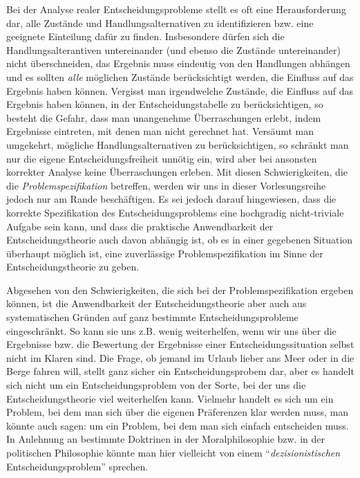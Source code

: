 Bei der Analyse realer Entscheidungsprobleme stellt es oft eine
Herausforderung  dar,
alle Zustände und Handlungsalternativen zu identifizieren bzw. eine
geeignete Einteilung dafür zu finden.  Insbesondere dürfen sich die
Handlungsalterantiven untereinander (und ebenso die Zustände
untereinander) nicht überschneiden, das Ergebnis muss eindeutig von
den Handlungen abhängen und es sollten {\em alle} möglichen Zustände
berücksichtigt werden, die Einfluss auf das Ergebnis haben
können. Vergisst man irgendwelche Zustände, die Einfluss auf das
Ergebnis haben können, in der Entscheidungstabelle zu berücksichtigen,
so besteht die Gefahr, dass man unangenehme Überraschungen erlebt,
indem Ergebnisse eintreten, mit denen man nicht gerechnet
hat. Versäumt man umgekehrt, mögliche Handlungsalternativen zu
berücksichtigen, so schränkt man nur die eigene Entscheidungsfreiheit
unnötig ein, wird aber bei ansonsten korrekter Analyse keine
Überraschungen erleben. Mit diesen Schwierigkeiten, die die {\em
  Problemspezifikation} betreffen, werden wir uns in dieser
Vorlesungsreihe jedoch nur am Rande beschäftigen. Es sei jedoch darauf
hingewiesen, dass die korrekte Spezifikation des Entscheidungsproblems
eine hochgradig nicht-triviale Aufgabe sein kann, und dass die
praktische Anwendbarkeit der Entscheidungstheorie auch davon abhängig
ist, ob es in einer gegebenen Situation überhaupt möglich ist, eine
zuverlässige Problemspezifikation im Sinne der Entscheidungstheorie zu
geben.

Abgesehen von den Schwierigkeiten, die sich bei der
Problemspezifikation ergeben  können, ist die Anwendbarkeit der
Entscheidungstheorie aber auch aus systematischen Gründen auf ganz
bestimmte Entscheidungsprobleme eingeschränkt. So kann sie uns
z.B. wenig weiterhelfen, wenn wir uns über die Ergebnisse bzw. die
Bewertung der Ergebnisse einer Entscheidungssituation selbst nicht im
Klaren sind. Die Frage, ob jemand im Urlaub lieber ans Meer oder in
die Berge fahren will, stellt ganz sicher ein Entscheidungsprobem dar,
aber es handelt sich nicht um ein Entscheidungsproblem von der Sorte,
bei der uns die Entscheidungstheorie viel weiterhelfen kann. Vielmehr
handelt es sich um ein Problem, bei dem man sich über die eigenen
Präferenzen klar werden muss, man könnte auch sagen: um ein Problem,
bei dem man sich einfach entscheiden muss. In Anlehnung an bestimmte
Doktrinen in der Moralphilosophie bzw. in der politischen Philosophie
könnte man hier vielleicht von einem "`{\em dezisionistischen}
Entscheidungsproblem"' sprechen.

